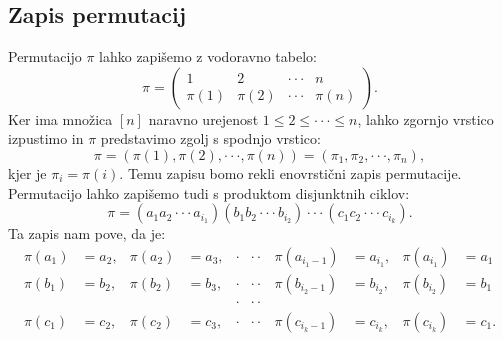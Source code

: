 \documentclass[a4paper, 12pt]{book}
\begin{document}
\subsection{ Zapis permutacij }
Permutacijo $\pi$ lahko zapišemo z vodoravno tabelo:
\[
    \pi = \begin{pmatrix}
        1 & 2 & \cdot\cdot\cdot & n \\
        \pi(1) & \pi(2) & \cdot\cdot\cdot & \pi(n)
    \end{pmatrix}.
\]
Ker ima množica $[n]$ naravno urejenost $1 \leq 2 \leq \cdot\cdot\cdot \leq n$, lahko zgornjo vrstico izpustimo in $\pi$ predstavimo zgolj s spodnjo vrstico:
\[
    \pi = (\pi(1), \pi(2), \cdot\cdot\cdot, \pi(n)) = (\pi_1, \pi_2, \cdot\cdot\cdot, \pi_n),
\]
kjer je $\pi_i = \pi(i)$.
Temu zapisu bomo rekli enovrstični zapis permutacije.
Permutacijo lahko zapišemo tudi s produktom disjunktnih ciklov:
\[
    \pi = (a_1 a_2 \cdot\cdot\cdot a_{i_1})(b_1 b_2 \cdot\cdot\cdot b_{i_2}) \cdot\cdot\cdot (c_1 c_2 \cdot\cdot\cdot c_{i_k}).
\]
Ta zapis nam pove, da je:
\begin{align*}
    \pi(a_1) &= a_2, & \pi(a_2) &= a_3, & \cdot&\cdot\cdot & \pi(a_{i_1-1}) &= a_{i_1}, & \pi(a_{i_1}) &= a_1 \\
    \pi(b_1) &= b_2, & \pi(b_2) &= b_3, & \cdot&\cdot\cdot & \pi(b_{i_2-1}) &= b_{i_2}, & \pi(b_{i_2}) &= b_1 \\
    &&&& \cdot&\cdot\cdot \\
    \pi(c_1) &= c_2, & \pi(c_2) &= c_3, & \cdot&\cdot\cdot & \pi(c_{i_k-1}) &= c_{i_k}, & \pi(c_{i_k}) &= c_1.
\end{align*}
\end{document}
